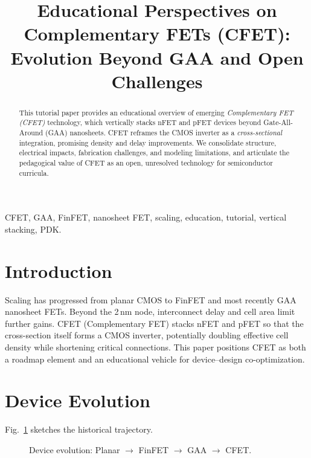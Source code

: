 \documentclass[conference]{IEEEtran}
\title{Educational Perspectives on Complementary FETs (CFET):\\
Evolution Beyond GAA and Open Challenges}
\author{
\IEEEauthorblockN{Shinichi Samizo}
\IEEEauthorblockA{Independent Semiconductor Researcher\\
Project Design Hub, Samizo-AITL\\
\textit{Email:} \href{mailto:shin3t72@gmail.com}{shin3t72@gmail.com}\\
\textit{GitHub:} \href{https://github.com/Samizo-AITL}{Samizo-AITL}}
}
\begin{document}
\maketitle

\begin{abstract}
This tutorial paper provides an educational overview of emerging
\emph{Complementary FET (CFET)} technology, which vertically stacks
nFET and pFET devices beyond Gate-All-Around (GAA) nanosheets.
CFET reframes the CMOS inverter as a \emph{cross-sectional} integration,
promising density and delay improvements. We consolidate structure,
electrical impacts, fabrication challenges, and modeling limitations,
and articulate the pedagogical value of CFET as an open, unresolved
technology for semiconductor curricula.
\end{abstract}

\begin{IEEEkeywords}
CFET, GAA, FinFET, nanosheet FET, scaling, education, tutorial, vertical stacking, PDK.
\end{IEEEkeywords}

\section{Introduction}
Scaling has progressed from planar CMOS to FinFET and most recently
GAA nanosheet FETs. Beyond the 2\,nm node, interconnect delay and cell
area limit further gains. CFET (Complementary FET) stacks nFET and pFET
so that the cross-section itself forms a CMOS inverter, potentially
doubling effective cell density while shortening critical connections.
This paper positions CFET as both a roadmap element and an educational
vehicle for device--design co-optimization.

\section{Device Evolution}
Fig.~\ref{fig:evolution} sketches the historical trajectory.

\begin{figure}[t]
\centering
{}
\caption{Device evolution: Planar $\rightarrow$ FinFET $\rightarrow$ GAA $\rightarrow$ CFET.}
\label{fig:evolution}
\end{figure}
\end{document}
